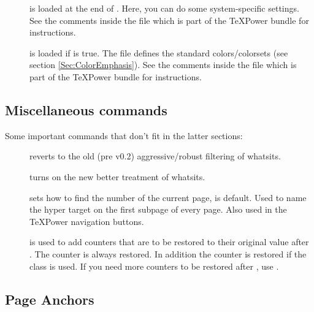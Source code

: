 \begin{slide}
\begin{description}
\item[]
  is loaded at the end of . Here, you can do some
  system-specific settings. See the comments inside the
  file  which is part of the
  \TeX Power bundle for instructions.

\item[]
  is loaded if  is true. The file defines the standard
  colors/colorsets (see section \ref{Sec:ColorEmphasis}). See the
  comments inside the file  which is part of the
  \TeX Power bundle for instructions.
\end{description}

\newslide

\subsection{Miscellaneous commands}\label{Sec:MiscCmd}
Some important commands that don't fit in the latter sections:
\begin{description}
\item[]
  reverts to the old (pre v0.2) aggressive/robust filtering of whatsits.
\item[]
  turns on the new better treatment of whatsits.
\item[]
  sets how to find the number of the current page,  is default.
  Used to name the hyper target on the first subpage of every page. Also used in the
  TeXPower navigation buttons.
\item[]
  is used to add counters that are to be restored to their original value after . The 
  counter is always restored. In addition the  counter is restored if the  class is used. If
  you need more counters to be restored after , use .
\end{description}

\newslide

\subsection{Page Anchors}\label{Sec:PageAnch}


\end{slide}
